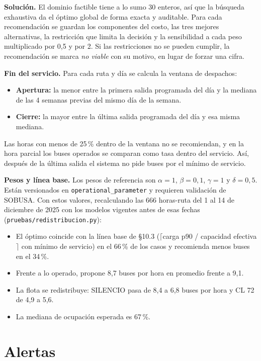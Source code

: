 \documentclass[10pt,a4paper]{article}
\newcommand{\cod}[1]{\texttt{\small #1}}
\begin{document}
\textbf{Solución.} El dominio factible tiene a lo sumo 30 enteros, así que la búsqueda exhaustiva da el óptimo global de forma exacta y auditable. Para cada recomendación se guardan los componentes del costo, las tres mejores alternativas, la restricción que limita la decisión y la sensibilidad a cada peso multiplicado por 0,5 y por 2. Si las restricciones no se pueden cumplir, la recomendación se marca \emph{no viable} con su motivo, en lugar de forzar una cifra.

\textbf{Fin del servicio.} Para cada ruta y día se calcula la ventana de despachos:

\begin{itemize}
  \item \textbf{Apertura:} la menor entre la primera salida programada del día y la mediana de las 4 semanas previas del mismo día de la semana.
  \item \textbf{Cierre:} la mayor entre la última salida programada del día y esa misma mediana.
\end{itemize}

Las horas con menos de 25\,\% dentro de la ventana no se recomiendan, y en la hora parcial los buses operados se comparan como tasa dentro del servicio. Así, después de la última salida el sistema no pide buses por el mínimo de servicio.

\textbf{Pesos y línea base.} Los pesos de referencia son $\alpha = 1$, $\beta = 0{,}1$, $\gamma = 1$ y $\delta = 0{,}5$. Están versionados en \cod{operational\_parameter} y requieren validación de SOBUSA. Con estos valores, recalculando las 666 horas-ruta del 1 al 14 de diciembre de 2025 con los modelos vigentes antes de esas fechas (\cod{pruebas/redistribucion.py}):

\begin{itemize}
  \item El óptimo coincide con la línea base de §10.3 ($\lceil$carga p90 / capacidad efectiva$\rceil$ con mínimo de servicio) en el 66\,\% de los casos y recomienda menos buses en el 34\,\%.
  \item Frente a lo operado, propone 8,7 buses por hora en promedio frente a 9,1.
  \item La flota se redistribuye: SILENCIO pasa de 8,4 a 6,8 buses por hora y CL 72 de 4,9 a 5,6.
  \item La mediana de ocupación esperada es 67\,\%.
\end{itemize}

\section{Alertas}
\end{document}

